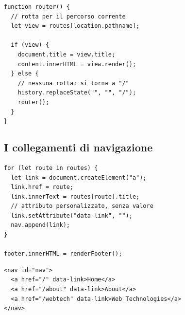 \begin{affianco}[0.42][c]
\begin{lstlisting}[style=js, name=main.js]
function router() {
  // rotta per il percorso corrente
  let view = routes[location.pathname];

  if (view) {
    document.title = view.title;
    content.innerHTML = view.render();
  } else {
    // nessuna rotta: si torna a "/"
    history.replaceState("", "", "/");
    router();
  }
}
\end{lstlisting}
\risultato
\begin{immagine}
\end{immagine}
\end{affianco}

\subsection{I collegamenti di navigazione}

\begin{affianco}[0.42][c]
\codicepiccolo
\begin{lstlisting}[style=js, name=main.js]
for (let route in routes) {
  let link = document.createElement("a");
  link.href = route;
  link.innerText = routes[route].title;
  // attributo personalizzato, senza valore
  link.setAttribute("data-link", "");
  nav.append(link);
}

footer.innerHTML = renderFooter();
\end{lstlisting}
\risultato
\begin{lstlisting}[style=html, name=DOM generato]
<nav id="nav">
  <a href="/" data-link>Home</a>
  <a href="/about" data-link>About</a>
  <a href="/webtech" data-link>Web Technologies</a>
</nav>
\end{lstlisting}
\begin{browser}[localhost:5173]
  \enspace{}\enspace{}
\end{browser}
\end{affianco}

